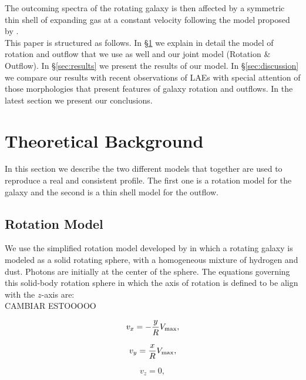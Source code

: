 \documentclass{latex/emulateapj}
\begin{document}
The outcoming spectra of the rotating galaxy is then affected by a symmetric thin shell of expanding gas at a constant velocity following the model proposed by \cite{2014arXiv1404.2958V, Orsi12}.   \\ 

This paper is structured as follows. In \S \ref{sec:theo} we explain in detail the model of rotation and outflow that we use as well and our joint model (Rotation \& Outflow). In \S \ref{sec:results} we present the results of our model. In \S \ref{sec:discussion} we compare our results with recent observations of LAEs with special attention of those morphologies that present features of galaxy rotation and outflows. In the latest section we present our conclusions.  \\

\section{Theoretical Background}
\label{sec:theo}
In this section we describe the two different models that together are used to reproduce a real and consistent \lya profile. The first one is a rotation model for the galaxy and the second is a thin shell model for the outflow. \\ 

\subsection{Rotation Model}

We use the simplified rotation model developed by \citep{Garavito14} in which a rotating galaxy is modeled as a solid rotating sphere, with a homogeneous mixture of hydrogen and dust. Photons are initially at the center of the sphere. The equations governing this solid-body rotation sphere in which the axis of rotation is defined to be align with the $z$-axis are: \\

CAMBIAR ESTOOOOO

\begin{equation}
v_{x}=-\frac{y}{R}V_{\rm max}, \label{subeq1}
\end{equation}

\begin{equation}
v_{y}=\frac{x}{R}V_{\rm max}, \label{subeq2}
\end{equation}

\begin{equation}
v_{z}=0, \label{subeq3}
\end{equation}
\end{document}
